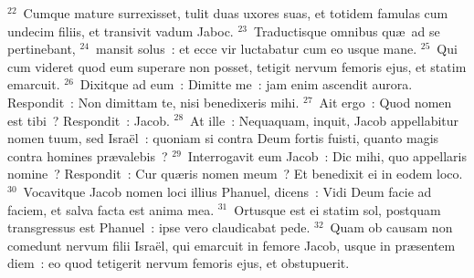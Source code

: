 ${}^{22}$~Cumque mature surrexisset, tulit duas uxores suas, et totidem famulas cum undecim filiis, et transivit vadum Jaboc.
${}^{23}$~Traductisque omnibus qu\ae\ ad se pertinebant,
${}^{24}$~mansit solus~: et ecce vir luctabatur cum eo usque mane.
${}^{25}$~Qui cum videret quod eum superare non posset, tetigit nervum femoris ejus, et statim emarcuit.
${}^{26}$~Dixitque ad eum~: Dimitte me~: jam enim ascendit aurora. Respondit~: Non dimittam te, nisi benedixeris mihi.
${}^{27}$~Ait ergo~: Quod nomen est tibi~? Respondit~: Jacob.
${}^{28}$~At ille~: Nequaquam, inquit, Jacob appellabitur nomen tuum, sed Isra\"el~: quoniam si contra Deum fortis fuisti, quanto magis contra homines pr\ae valebis~?
${}^{29}$~Interrogavit eum Jacob~: Dic mihi, quo appellaris nomine~? Respondit~: Cur qu\ae ris nomen meum~? Et benedixit ei in eodem loco.
${}^{30}$~Vocavitque Jacob nomen loci illius Phanuel, dicens~: Vidi Deum facie ad faciem, et salva facta est anima mea.
${}^{31}$~Ortusque est ei statim sol, postquam transgressus est Phanuel~: ipse vero claudicabat pede.
${}^{32}$~Quam ob causam non comedunt nervum filii Isra\"el, qui emarcuit in femore Jacob, usque in pr\ae sentem diem~: eo quod tetigerit nervum femoris ejus, et obstupuerit.

